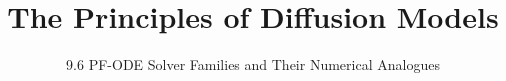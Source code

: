 ﻿%

\title{The Principles of Diffusion Models}
\subtitle{9.6 PF-ODE Solver Families and Their Numerical Analogues}


\begin{frame}
    \titlepage
\end{frame}


